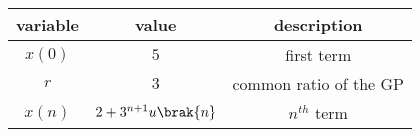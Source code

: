 \begin{tabular}{|c|c|c|}
   \hline
   variable&value&description \\
   \hline
   $x(0)$ & $5$ & first term \\
   \hline
   $r$ & $3$ & common ratio of the GP\\
   \hline
   $x(n)$ & $2+3^{n+1}u\brak{n}$& $n^{th}$ term \\
   \hline
\end{tabular}


